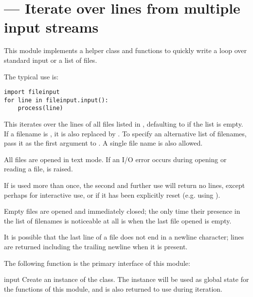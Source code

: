 \section{ ---
         Iterate over lines from multiple input streams}



This module implements a helper class and functions to quickly write a
loop over standard input or a list of files.

The typical use is:

\begin{verbatim}
import fileinput
for line in fileinput.input():
    process(line)
\end{verbatim}

This iterates over the lines of all files listed in
, defaulting to  if the list is
empty.  If a filename is , it is also replaced by
.  To specify an alternative list of filenames, pass
it as the first argument to .  A single file name is
also allowed.

All files are opened in text mode.  If an I/O error occurs during
opening or reading a file,  is raised.

If  is used more than once, the second and further use
will return no lines, except perhaps for interactive use, or if it has
been explicitly reset (e.g. using ).

Empty files are opened and immediately closed; the only time their
presence in the list of filenames is noticeable at all is when the
last file opened is empty.

It is possible that the last line of a file does not end in a newline
character; lines are returned including the trailing newline when it
is present.

The following function is the primary interface of this module:

\begin{funcdesc}{input}{}
  Create an instance of the  class.  The instance
  will be used as global state for the functions of this module, and
  is also returned to use during iteration.
\end{funcdesc}


